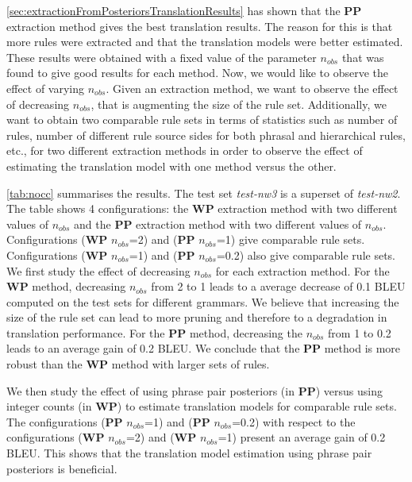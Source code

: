 \autoref{sec:extractionFromPosteriorsTranslationResults} has shown that the
{\bf PP} extraction method gives the best translation results. The reason for
this is that more rules were extracted and that the translation models were
better estimated. These results were obtained with a fixed value of the
parameter $n_{obs}$ that was found to give good results for each method. Now, we
would like to observe the effect of varying $n_{obs}$. Given an extraction
method, we want to observe the effect of decreasing $n_{obs}$, that is
augmenting the size of the rule set. Additionally, we want to obtain two
comparable rule sets in terms of statistics such as number of rules, number of
different rule source sides for both phrasal and hierarchical rules, etc., for
two different extraction methods in order to observe the effect of estimating
the translation model with one method versus the other.

\autoref{tab:nocc} summarises the results. The test set {\em test-nw3} is a
superset of {\em test-nw2}. The table shows 4 configurations: the {\bf WP}
extraction method with two different values of $n_{obs}$ and the {\bf PP}
extraction method with two different values of $n_{obs}$. Configurations
({\bf WP} $n_{obs}$=2) and ({\bf PP} $n_{obs}$=1) give comparable rule sets.
Configurations ({\bf WP} $n_{obs}$=1) and ({\bf PP} $n_{obs}$=0.2) also give
comparable rule sets. We first study the effect of decreasing $n_{obs}$ for each
extraction method. For the {\bf WP} method, decreasing $n_{obs}$ from 2 to 1
leads to a average decrease of 0.1 BLEU computed on the test sets for different
grammars. We believe that increasing the size of the rule set can lead to more
pruning and therefore to a degradation in translation performance. For the
{\bf PP} method, decreasing the $n_{obs}$ from 1 to 0.2 leads to an average gain
of 0.2 BLEU. We conclude that the {\bf PP} method is more robust than the
{\bf WP} method with larger sets of rules.

We then study the effect of using phrase pair posteriors (in {\bf PP}) versus
using integer counts (in {\bf WP}) to estimate translation models for comparable
rule sets. The configurations ({\bf PP} $n_{obs}$=1) and
({\bf PP} $n_{obs}$=0.2) with respect to the configurations
({\bf WP} $n_{obs}$=2) and ({\bf WP} $n_{obs}$=1) present an average gain of
0.2 BLEU. This shows that the translation model estimation using phrase pair
posteriors is beneficial.

